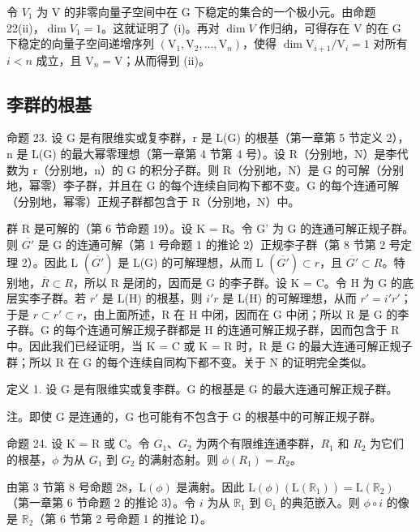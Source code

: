 令 \(V_{1}\) 为 V 的非零向量子空间中在 G 下稳定的集合的一个极小元。由命题 22(ii)，\(\dim V_{1} = 1\)。这就证明了 (i)。再对 \(\dim V\) 作归纳，可得存在 V 的在 G 下稳定的向量子空间递增序列 \((\mathrm{V}_1, \mathrm{V}_2, \ldots, \mathrm{V}_n)\)，使得 \(\dim \mathrm{V}_{i+1} / \mathrm{V}_i = 1\) 对所有 \(i < n\) 成立，且 \(\mathrm{V}_n = \mathrm{V}\)；从而得到 (ii)。

\subsection{李群的根基}

命题 23. 设 G 是有限维实或复李群，r 是 L(G) 的根基（第一章第 5 节定义 2），n 是 L(G) 的最大幂零理想（第一章第 4 节第 4 号）。设 R（分别地，N）是李代数为 r（分别地，n）的 G 的积分子群。则 R（分别地，N）是 G 的可解（分别地，幂零）李子群，并且在 G 的每个连续自同构下都不变。G 的每个连通可解（分别地，幂零）正规子群都包含于 R（分别地，N）中。

群 R 是可解的（第 6 节命题 19）。设 K = R。令 G' 为 G 的连通可解正规子群。则 \(\overline{G'}\) 是 G 的连通可解（第 1 号命题 1 的推论 2）正规李子群（第 8 节第 2 号定理 2）。因此 L \((\overline{G'})\) 是 L(G) 的可解理想，从而 L \((\overline{G'}) \subset r\)，且 \(\overline{G'} \subset R\)。特别地，\(\overline{R} \subset R\)，所以 R 是闭的，因而是 G 的李子群。设 K = C。令 H 为 G 的底层实李子群。若 \(r'\) 是 L(H) 的根基，则 \(i'r\) 是 L(H) 的可解理想，从而 \(r' = i'r'\)；于是 \(r \subset r' \subset r\)，由上面所述，R 在 H 中闭，因而在 G 中闭；所以 R 是 G 的李子群。G 的每个连通可解正规子群都是 H 的连通可解正规子群，因而包含于 R 中。因此我们已经证明，当 K = C 或 K = R 时，R 是 G 的最大连通可解正规子群；所以 R 在 G 的每个连续自同构下都不变。关于 N 的证明完全类似。

定义 1. 设 G 是有限维实或复李群。G 的根基是 G 的最大连通可解正规子群。

注。即使 G 是连通的，G 也可能有不包含于 G 的根基中的可解正规子群。

命题 24. 设 K = R 或 C。令 \(G_{1}\)、\(G_{2}\) 为两个有限维连通李群，\(R_{1}\) 和 \(R_{2}\) 为它们的根基，\(\phi\) 为从 \(G_{1}\) 到 \(G_{2}\) 的满射态射。则 \(\phi(R_{1}) = R_{2}\)。

由第 3 节第 8 号命题 28，\(\mathrm{L}(\phi)\) 是满射。因此 \(\mathrm{L}(\phi)(\mathrm{L}(\mathbb{R}_1)) = \mathrm{L}(\mathbb{R}_2)\)（第一章第 6 节命题 2 的推论 3）。令 \(i\) 为从 \(\mathbb{R}_1\) 到 \(\mathbb{G}_1\) 的典范嵌入。则 \(\phi \circ i\) 的像是 \(\mathbb{R}_2\)（第 6 节第 2 号命题 1 的推论 I）。

